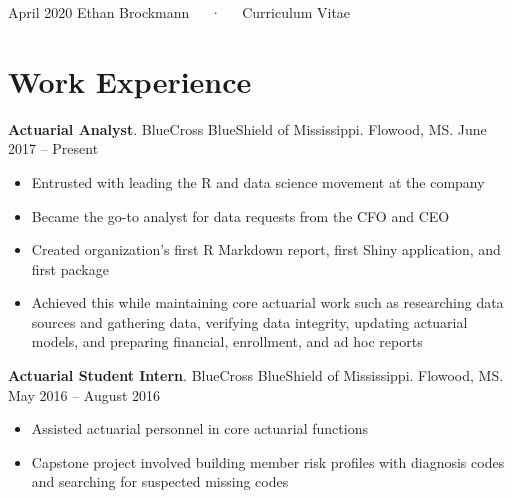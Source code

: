 \documentclass[11pt, a4paper]{awesome-cv}
\begin{document}
\makecvheader

\makecvfooter
  {April 2020}
    {Ethan Brockmann~~~·~~~Curriculum Vitae}
  {\thepage}





\hypertarget{work-experience}{%
\section{Work Experience}\label{work-experience}}

\textbf{Actuarial Analyst}. BlueCross BlueShield of Mississippi.
Flowood, MS. June 2017 -- Present

\begin{itemize}
\item
  Entrusted with leading the R and data science movement at the company
\item
  Became the go-to analyst for data requests from the CFO and CEO
\item
  Created organization's first R Markdown report, first Shiny
  application, and first package
\item
  Achieved this while maintaining core actuarial work such as
  researching data sources and gathering data, verifying data integrity,
  updating actuarial models, and preparing financial, enrollment, and ad
  hoc reports
\end{itemize}

\textbf{Actuarial Student Intern}. BlueCross BlueShield of Mississippi.
Flowood, MS. May 2016 -- August 2016

\begin{itemize}
\item
  Assisted actuarial personnel in core actuarial functions
\item
  Capstone project involved building member risk profiles with diagnosis
  codes and searching for suspected missing codes
\end{itemize}
\end{document}
